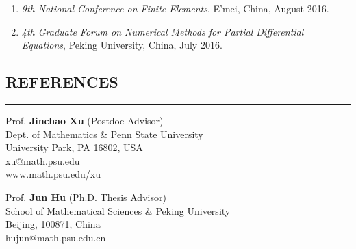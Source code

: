 \documentclass[10pt,a4]{article}
\begin{document}
\begin{small}
\begin{enumerate}
    \item 
       {\it 9th National Conference on Finite Elements}, E'mei, China, August 2016. 

    \item  
       {\it 4th Graduate Forum on Numerical Methods for Partial Differential Equations}, Peking University, China, July 2016. 
   
\end{enumerate}
 
 


\vspace{0.1cm}

\subsection*{REFERENCES}
\hrule
\vspace{0.2cm}
 
\begin{footnotesize}

\begin{multicols}{2} 
\noindent 
Prof. \textbf{Jinchao Xu} (Postdoc Advisor) \\ 
Dept. of Mathematics \& Penn State University\\
University Park, PA 16802, USA\\
xu@math.psu.edu \\
www.math.psu.edu/xu\\

\columnbreak

\noindent
Prof. \textbf{Jun Hu} (Ph.D. Thesis Advisor)\\ 
School of Mathematical Sciences \& Peking University \\
Beijing, 100871, China \\  
hujun@math.psu.edu.cn \\


\end{multicols}

\end{footnotesize}
\end{small}
\end{document}
